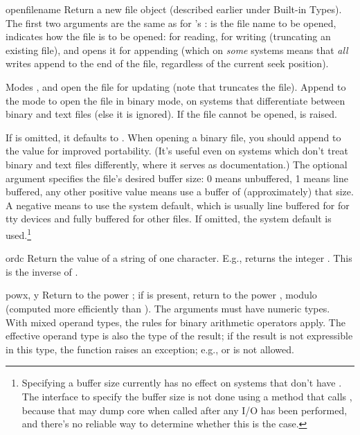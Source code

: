 \begin{funcdesc}{open}{filename}
  Return a new file object (described earlier under Built-in Types).
  The first two arguments are the same as for 's
  :  is the file name to be opened,
   indicates how the file is to be opened:  for
  reading,  for writing (truncating an existing file), and
   opens it for appending (which on \emph{some} \UNIX{}
  systems means that \emph{all} writes append to the end of the file,
  regardless of the current seek position).

  Modes ,  and  open the file for
  updating (note that  truncates the file).  Append
   to the mode to open the file in binary mode, on systems
  that differentiate between binary and text files (else it is
  ignored).  If the file cannot be opened,  is
  raised.

  If  is omitted, it defaults to .  When opening a 
  binary file, you should append  to the  value
  for improved portability.  (It's useful even on systems which don't
  treat binary and text files differently, where it serves as
  documentation.)  The optional  argument specifies the
  file's desired buffer size: 0 means unbuffered, 1 means line
  buffered, any other positive value means use a buffer of
  (approximately) that size.  A negative  means to use
  the system default, which is usually line buffered for for tty
  devices and fully buffered for other files.  If omitted, the system
  default is used.\footnote{
    Specifying a buffer size currently has no effect on systems that
    don't have .  The interface to specify the
    buffer size is not done using a method that calls
    , because that may dump core when called
    after any I/O has been performed, and there's no reliable way to
    determine whether this is the case.}
\end{funcdesc}

\begin{funcdesc}{ord}{c}
  Return the \ASCII{} value of a string of one character.  E.g.,
   returns the integer .  This is the inverse of
  .
\end{funcdesc}

\begin{funcdesc}{pow}{x, y}
  Return  to the power ; if  is present, return
   to the power , modulo  (computed more
  efficiently than ).
  The arguments must have
  numeric types.  With mixed operand types, the rules for binary
  arithmetic operators apply.  The effective operand type is also the
  type of the result; if the result is not expressible in this type, the
  function raises an exception; e.g.,  or  is not allowed.
\end{funcdesc}

